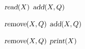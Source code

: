 
\begin{algorithm}[H]
  \begin{algorithmic}[1]
	\State $\textsl{read}(X)$
	\State $\textsl{add}(X, Q)$
      \EndFor

      \hStatex
	  \State $\textsl{remove}(X, Q)$
	  \State $\textsl{add}(X, Q)$
	\EndWhile
        
	\hStatex
	\State $\textsl{remove}(X, Q)$
	\State $\textsl{print}(X)$
      \EndFor
    \EndProcedure
  \end{algorithmic}
\end{algorithm}
